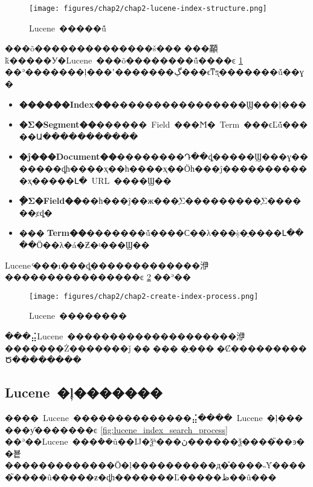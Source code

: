     \begin{figure}[htbp]
        \centering
        \texttt{[image: figures/chap2/chap2-lucene-index-structure.png]}
        \vspace{-1em}
        \caption{Lucene~�����ṹ}
        \label{fig:lucene_index_structure}
    \end{figure}

���õ��������������š���׺���顢ǩ�����У�Lucene~���õ��������ṹ\cite{lucene3}����ͼ \ref{fig:lucene_index_structure} ��ʾ�������ļ���ʽ�������ڲ���ϵͳƽ̨�������ṹ��ɣ�

\begin{itemize}
  \item \textbf{������Index��}����������������Ϣ���ļ���
  \item \textbf{�Σ�Segment��}������~Field~���Ϻ�~Term~���ϵĽṹ�����Ա�����������
  \item \textbf{�ĵ���Document��}��������Դ��ȡ�����Ϣ���ɣ�������ȡһ����ҳ��һ����ҳ��Ӧһ���ĵ�����������ҳ�����Լ�~URL~����Ϣ��
  \item \textbf{�ֶΣ�Field��}��һ���ĵ��ж���ֶΣ���������ֶΣ������ֶεȡ�
  \item \textbf{���Term��}�������ṹ����С��λ���ṩ�ַ����Լ����Ӧ��λ�á�Ƶ�ʵ���Ϣ��
\end{itemize}

Lucene~ͨ���ı���ȡ�������������洢����������������ͼ \ref{fig:lucene_index_create_process} ��ʾ��

    \begin{figure}[htbp]
        \centering
        \texttt{[image: figures/chap2/chap2-create-index-process.png]}
        \vspace{-1em}
        \caption{Lucene~��������}
        \label{fig:lucene_index_create_process}
    \end{figure}

���⣬Lucene~��������������������洢�������Ż�������ǰ׺��׺���򡢲�ֵ���򡢻�Ȼ���������Ծ������\cite{lucene_index_4}��


\subsection{Lucene~�ļ�������}

����~Lucene~��������������⣬����~Lucene~�ļ������ƴ�������ͼ \ref{fig:lucene_index_search_process} ��ʾ��Lucene~���ܵ��û��Ĳ�ѯʱ���ڽ������ѯ����֮��ͽ��뵽�������������Ӧ�ļ����������д�֡����˵Ȳ�����֮����û�����ƶ�ȡһ�������Ľ�����ظ��û���

